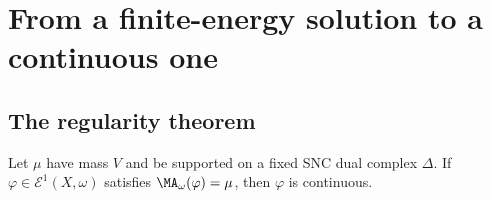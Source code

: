 \section{From a finite-energy solution to a continuous one}
\label{sec:ch29-regularity}

\subsection{The regularity theorem}
\label{sec:ch29-regularity-theorem}

\begin{theorem}\label{thm:bfj-supported-regularity}
Let \(\mu\) have mass \(V\) and be supported on a fixed SNC dual complex
\(\Delta\).  If \(\varphi\in\mathcal E^1(X,\omega)\) satisfies
\(\MA_\omega(\varphi)=\mu\), then \(\varphi\) is continuous.
\end{theorem}

